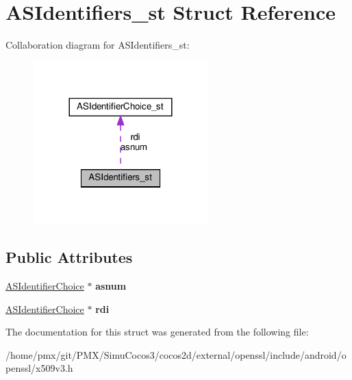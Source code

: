 \hypertarget{structASIdentifiers__st}{}\section{A\+S\+Identifiers\+\_\+st Struct Reference}
\label{structASIdentifiers__st}


Collaboration diagram for A\+S\+Identifiers\+\_\+st\+:
\nopagebreak
\begin{figure}[H]
\begin{center}
\leavevmode
\includegraphics[width=192pt]{structASIdentifiers__st__coll__graph}
\end{center}
\end{figure}
\subsection*{Public Attributes}
\begin{DoxyCompactItemize}
\item 
\mbox{\label{structASIdentifiers__st_a1b8671be8e5b28ce4656aea7dbf12962}} 
\hyperlink{structASIdentifierChoice__st}{A\+S\+Identifier\+Choice} $\ast$ {\bfseries asnum}
\item 
\mbox{\label{structASIdentifiers__st_afa2c22bf2d18e3d2ce749486b455e0c7}} 
\hyperlink{structASIdentifierChoice__st}{A\+S\+Identifier\+Choice} $\ast$ {\bfseries rdi}
\end{DoxyCompactItemize}


The documentation for this struct was generated from the following file\+:\begin{DoxyCompactItemize}
\item 
/home/pmx/git/\+P\+M\+X/\+Simu\+Cocos3/cocos2d/external/openssl/include/android/openssl/x509v3.\+h\end{DoxyCompactItemize}
